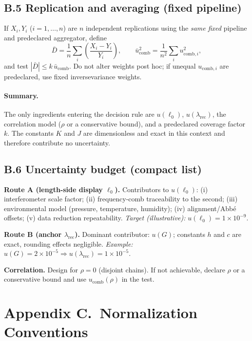 \documentclass[11pt]{article}
\theoremstyle{plain}
\theoremstyle{definition}
\theoremstyle{remark}
\begin{document}
\subsection*{B.5 Replication and averaging (fixed pipeline)}
If \(X_i,Y_i\) (\(i=1,\dots,n\)) are \(n\) independent replications using the \emph{same fixed} pipeline and pre\-declared aggregator, define
\[
\bar{D}=\frac{1}{n}\sum_i \left(\frac{X_i-Y_i}{Y_i}\right),\qquad
\bar{u}_{\mathrm{comb}}^2=\frac{1}{n^2}\sum_i u_{\mathrm{comb},i}^2,
\]
and test \(|\bar{D}| \le k\,\bar{u}_{\mathrm{comb}}\). Do not alter weights post hoc; if unequal \(u_{\mathrm{comb},i}\) are pre\-declared, use fixed inverse\-variance weights.

\paragraph{Summary.}
The only ingredients entering the decision rule are \(u(\ell_0)\), \(u(\lambda_{\mathrm{rec}})\), the correlation model (\(\rho\) or a conservative bound), and a pre\-declared coverage factor \(k\). The constants \(K\) and \(J\) are dimensionless and exact in this context and therefore contribute no uncertainty.

\subsection*{B.6 Uncertainty budget (compact list)}
\textbf{Route A (length-side display \(\ell_0\)).} Contributors to \(u(\ell_0)\): (i) interferometer scale factor; (ii) frequency-comb traceability to the second; (iii) environmental model (pressure, temperature, humidity); (iv) alignment/Abbé offsets; (v) data reduction repeatability. \emph{Target (illustrative):} \(u(\ell_0)=1\times10^{-9}\).

\textbf{Route B (anchor \(\lambda_{\mathrm{rec}}\)).} Dominant contributor: \(u(G)\); constants \(h\) and \(c\) are exact, rounding effects negligible. \emph{Example:} \(u(G)=2\times10^{-5}\Rightarrow u(\lambda_{\mathrm{rec}})=1\times10^{-5}\).

\textbf{Correlation.} Design for \(\rho=0\) (disjoint chains). If not achievable, declare \(\rho\) or a conservative bound and use \(u_{\mathrm{comb}}(\rho)\) in the test.

\section*{Appendix C.\ Normalization Conventions}
\end{document}
